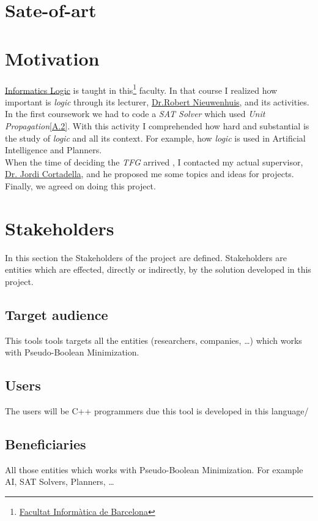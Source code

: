 \section{Sate-of-art}



\section{Motivation}

\href{https://www.fib.upc.edu/en/studies/bachelors-degrees/bachelor-degree-informatics-engineering/curriculum/syllabus/LI}{Informatics Logic} is taught in this\footnote{\href{https://www.fib.upc.edu/en/}{Facultat Informàtica de Barcelona}} faculty. In that course I realized how important is \emph{logic} through its lecturer, \href{http://www.lsi.upc.es/~roberto/}{Dr.Robert Nieuwenhuis}, and its activities. \\

In the first coursework we had to code a \emph{SAT Solver} which used \emph{Unit Propagation}\ref{A.2}. With this activity I comprehended how hard and substantial is the study of \emph{logic} and all its context. For example, how \emph{logic} is used in Artificial Intelligence and Planners.\\

When the time of deciding the \emph{TFG} arrived	, I contacted my actual supervisor, \href{https://www.cs.upc.edu/~jordicf/}{Dr. Jordi Cortadella}, and he proposed me some topics and ideas for projects. Finally, we agreed on doing this project. 

\section{Stakeholders}

In this section the Stakeholders of the project are defined. Stakeholders are entities which are effected, directly or indirectly, by the solution developed in this project. 
\subsection{Target audience}
This tools tools targets all the entities (researchers, companies, \ldots) which works with Pseudo-Boolean Minimization. 
\subsection{Users}
The users will be C++ programmers due this tool is developed in this language/
\subsection{Beneficiaries}
All those entities which works with Pseudo-Boolean Minimization. For example AI, SAT Solvers, Planners, \ldots


